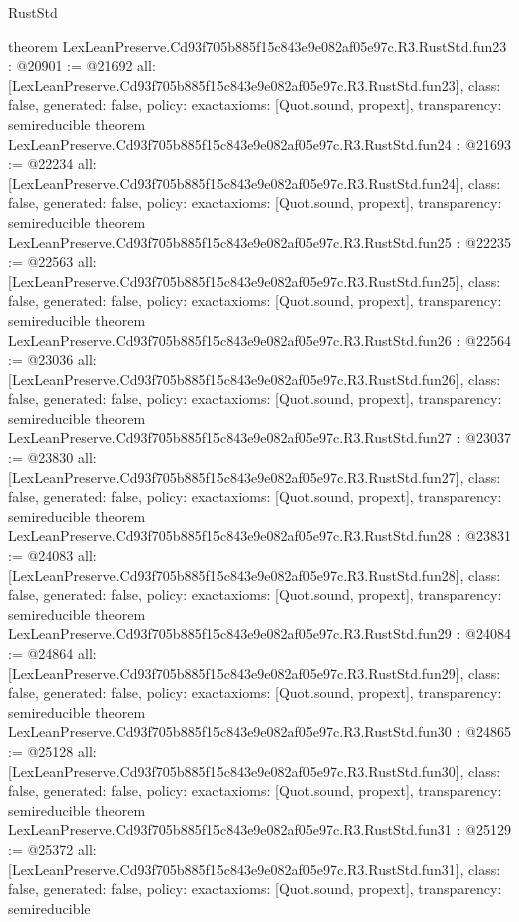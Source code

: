 \begin{lexlean}{RustStd}
\begin{coremodule}
{}
theorem LexLeanPreserve.Cd93f705b885f15c843e9e082af05e97c.R3.RustStd.fun23 : @20901 := @21692 {
  all: [LexLeanPreserve.Cd93f705b885f15c843e9e082af05e97c.R3.RustStd.fun23],
  class: false,
  generated: false,
  policy: exact{axioms: [Quot.sound, propext]},
  transparency: semireducible
}
theorem LexLeanPreserve.Cd93f705b885f15c843e9e082af05e97c.R3.RustStd.fun24 : @21693 := @22234 {
  all: [LexLeanPreserve.Cd93f705b885f15c843e9e082af05e97c.R3.RustStd.fun24],
  class: false,
  generated: false,
  policy: exact{axioms: [Quot.sound, propext]},
  transparency: semireducible
}
theorem LexLeanPreserve.Cd93f705b885f15c843e9e082af05e97c.R3.RustStd.fun25 : @22235 := @22563 {
  all: [LexLeanPreserve.Cd93f705b885f15c843e9e082af05e97c.R3.RustStd.fun25],
  class: false,
  generated: false,
  policy: exact{axioms: [Quot.sound, propext]},
  transparency: semireducible
}
theorem LexLeanPreserve.Cd93f705b885f15c843e9e082af05e97c.R3.RustStd.fun26 : @22564 := @23036 {
  all: [LexLeanPreserve.Cd93f705b885f15c843e9e082af05e97c.R3.RustStd.fun26],
  class: false,
  generated: false,
  policy: exact{axioms: [Quot.sound, propext]},
  transparency: semireducible
}
theorem LexLeanPreserve.Cd93f705b885f15c843e9e082af05e97c.R3.RustStd.fun27 : @23037 := @23830 {
  all: [LexLeanPreserve.Cd93f705b885f15c843e9e082af05e97c.R3.RustStd.fun27],
  class: false,
  generated: false,
  policy: exact{axioms: [Quot.sound, propext]},
  transparency: semireducible
}
theorem LexLeanPreserve.Cd93f705b885f15c843e9e082af05e97c.R3.RustStd.fun28 : @23831 := @24083 {
  all: [LexLeanPreserve.Cd93f705b885f15c843e9e082af05e97c.R3.RustStd.fun28],
  class: false,
  generated: false,
  policy: exact{axioms: [Quot.sound, propext]},
  transparency: semireducible
}
theorem LexLeanPreserve.Cd93f705b885f15c843e9e082af05e97c.R3.RustStd.fun29 : @24084 := @24864 {
  all: [LexLeanPreserve.Cd93f705b885f15c843e9e082af05e97c.R3.RustStd.fun29],
  class: false,
  generated: false,
  policy: exact{axioms: [Quot.sound, propext]},
  transparency: semireducible
}
theorem LexLeanPreserve.Cd93f705b885f15c843e9e082af05e97c.R3.RustStd.fun30 : @24865 := @25128 {
  all: [LexLeanPreserve.Cd93f705b885f15c843e9e082af05e97c.R3.RustStd.fun30],
  class: false,
  generated: false,
  policy: exact{axioms: [Quot.sound, propext]},
  transparency: semireducible
}
theorem LexLeanPreserve.Cd93f705b885f15c843e9e082af05e97c.R3.RustStd.fun31 : @25129 := @25372 {
  all: [LexLeanPreserve.Cd93f705b885f15c843e9e082af05e97c.R3.RustStd.fun31],
  class: false,
  generated: false,
  policy: exact{axioms: [Quot.sound, propext]},
  transparency: semireducible
}
\end{coremodule}
\end{lexlean}
